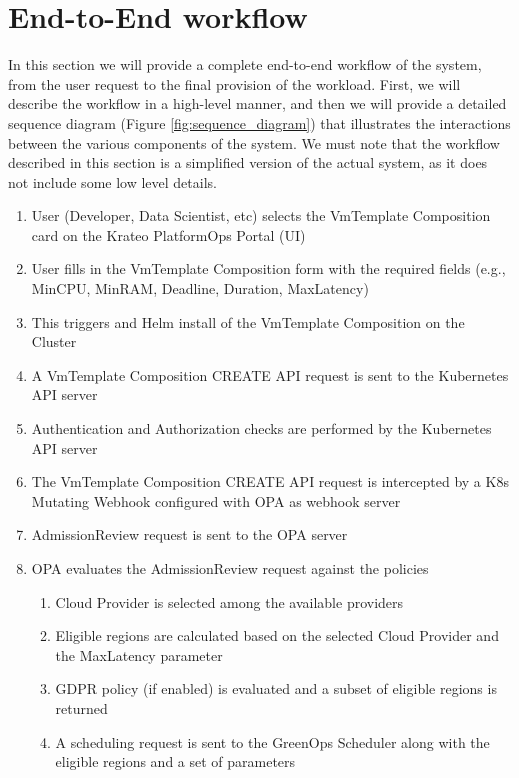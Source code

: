 \newpage

\section{End-to-End workflow}
\label{sec:e2eflow}

In this section we will provide a complete end-to-end workflow of the system, from the user request to the final provision of the workload.
First, we will describe the workflow in a high-level manner, and then we will provide a detailed sequence diagram (Figure \ref{fig:sequence_diagram}) that illustrates the interactions between the various components of the system.
We must note that the workflow described in this section is a simplified version of the actual system, as it does not include some low level details.

\begin{enumerate}
  \item User (Developer, Data Scientist, etc) selects the VmTemplate Composition card on the Krateo PlatformOps Portal (UI)
  \item User fills in the VmTemplate Composition form with the required fields (e.g., MinCPU, MinRAM, Deadline, Duration, MaxLatency)
  \item This triggers and Helm install of the VmTemplate Composition on the Cluster
  \item A VmTemplate Composition CREATE API request is sent to the Kubernetes API server
  \item Authentication and Authorization checks are performed by the Kubernetes API server
  \item The VmTemplate Composition CREATE API request is intercepted by a K8s Mutating Webhook configured with OPA as webhook server
  \item AdmissionReview request is sent to the OPA server
  \item OPA evaluates the AdmissionReview request against the policies
  \begin{enumerate}
    \item Cloud Provider is selected among the available providers
    \item Eligible regions are calculated based on the selected Cloud Provider and the MaxLatency parameter
    \item GDPR policy (if enabled) is evaluated and a subset of eligible regions is returned
    \item A scheduling request is sent to the GreenOps Scheduler along with the eligible regions and a set of parameters

\end{enumerate}
\end{enumerate}
